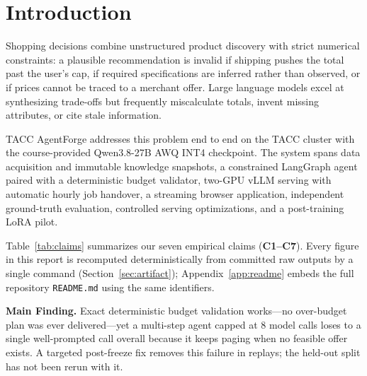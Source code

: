 \documentclass[10pt,letterpaper,twocolumn]{article}
\begin{document}
\section{Introduction}\label{sec:intro}

Shopping decisions combine unstructured product discovery with strict numerical constraints: a plausible recommendation
is invalid if shipping pushes the total past the user's cap, if required specifications are inferred rather than
observed, or if prices cannot be traced to a merchant offer. Large language models excel at synthesizing trade-offs but
frequently miscalculate totals, invent missing attributes, or cite stale information.

TACC AgentForge addresses this problem end to end on the TACC cluster with the course-provided Qwen3.8-27B AWQ INT4
checkpoint. The system spans data acquisition and immutable knowledge snapshots, a constrained LangGraph agent paired
with a deterministic budget validator, two-GPU vLLM serving with automatic hourly job handover, a streaming browser
application, independent ground-truth evaluation, controlled serving optimizations, and a post-training LoRA pilot.

Table~\ref{tab:claims} summarizes our seven empirical claims (\textbf{C1--C7}). Every figure in this report is
recomputed deterministically from committed raw outputs by a single command (Section~\ref{sec:artifact}); Appendix~\ref{app:readme}
embeds the full repository \texttt{README.md} using the same identifiers.

\begin{findingbox}
\textbf{Main Finding.} Exact deterministic budget validation works---no over-budget plan was ever delivered---yet a
multi-step agent capped at 8 model calls loses to a single well-prompted call overall because it keeps paging when no
feasible offer exists. A targeted post-freeze fix removes this failure in replays; the held-out split has not been
rerun with it.
\end{findingbox}
\end{document}
